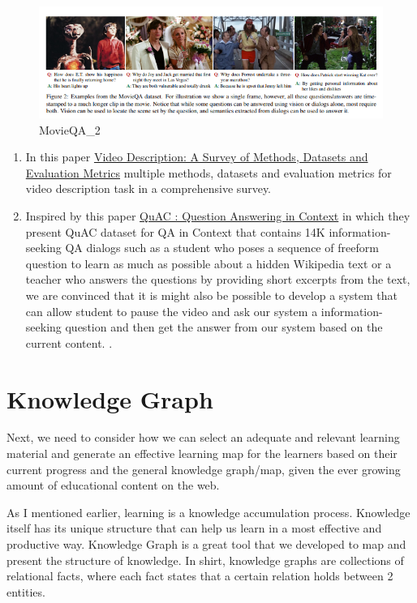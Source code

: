 \documentclass{acm_proc_article-sp}
\begin{document}
\begin{figure}
\centering
\includegraphics{img/movieqa2.png}
\caption{MovieQA\_2}
\end{figure}

\begin{enumerate}
\def\labelenumi{\arabic{enumi}.}
\setcounter{enumi}{4}
\item
  In this paper \href{https://arxiv.org/pdf/1806.00186.pdf}{Video
  Description: A Survey of Methods, Datasets and Evaluation Metrics}
  multiple methods, datasets and evaluation metrics for video
  description task in a comprehensive survey.
\item
  Inspired by this paper
  \href{https://arxiv.org/pdf/1808.07036.pdf}{QuAC : Question Answering
  in Context} in which they present QuAC dataset for QA in Context that
  contains 14K information-seeking QA dialogs such as a student who
  poses a sequence of freeform question to learn as much as possible
  about a hidden Wikipedia text or a teacher who answers the questions
  by providing short excerpts from the text, we are convinced that it is
  might also be possible to develop a system that can allow student to
  pause the video and ask our system a information-seeking question and
  then get the answer from our system based on the current content. .
\end{enumerate}

\section{Knowledge Graph}\label{knowledge-graph}

Next, we need to consider how we can select an adequate and relevant
learning material and generate an effective learning map for the
learners based on their current progress and the general knowledge
graph/map, given the ever growing amount of educational content on the
web.

As I mentioned earlier, learning is a knowledge accumulation process.
Knowledge itself has its unique structure that can help us learn in a
most effective and productive way. Knowledge Graph is a great tool that
we developed to map and present the structure of knowledge. In shirt,
knowledge graphs are collections of relational facts, where each fact
states that a certain relation holds between 2 entities.
\end{document}
